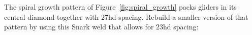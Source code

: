 \begin{multicols}{2}
	
	\mfilbreak
	
	
	\begin{problem}\label{exer:snark_spiral_weld} 
		The spiral growth pattern of Figure~\ref{fig:spiral_growth} packs gliders in its central diamond together with $27$hd spacing. Rebuild a smaller version of that pattern by using this Snark weld that allows for $23$hd spacing:
		
		\noindent\begin{center}
		\end{center}
		
	\end{problem}
	
\end{multicols}\normalsize\ifdefined\FORPRINTING{}\else%
\fi
